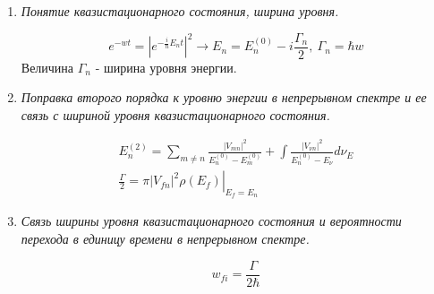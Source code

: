 \documentclass{article}
\begin{document}
\begin{enumerate}
	\item \textit{Понятие квазистационарного состояния, ширина уровня.}
	
	\begin{equation}
		e^{-wt} = |e^{-\frac{i}{\hbar}E_n t}|^2 \rightarrow E_n = E_n^{(0)} - i\frac{\Gamma_n}{2}, \ \Gamma_n=\hbar w
	\end{equation}
	Величина $\Gamma_n$ - ширина уровня энергии.
	
	\item \textit{Поправка второго порядка к уровню энергии в непрерывном спектре и ее связь с шириной
уровня квазистационарного состояния.}

	\begin{gather}
		E_n^{(2)} = \sum\limits_{m\neq n} \frac{|V_{mn}|^2}{E_n^{(0)} - E_m^{(0)}} + \int \frac{|V_{\nu n}|^2}{E_n^{(0)} - E_\nu} d\nu_E \\
		\frac{\Gamma}{2} = \left.\pi |V_{fn}|^2 \rho(E_f)\right|_{E_f=E_n}
	\end{gather}
	
	\item \textit{Связь ширины уровня квазистационарного состояния и вероятности перехода в единицу времени в непрерывном спектре.}
	
	\begin{equation}
		w_{fi} = \frac{\Gamma}{2\hbar}
	\end{equation}
\end{enumerate}
	
{}
\end{document}
